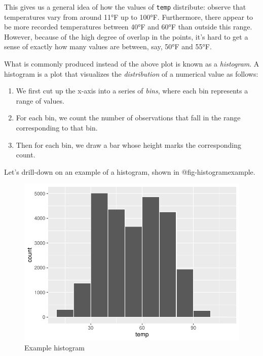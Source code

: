 \documentclass[
  letterpaper,
  DIV=11,
  numbers=noendperiod]{scrreprt}
\theoremstyle{definition}
\theoremstyle{remark}
\begin{document}
This gives us a general idea of how the values of \texttt{temp}
distribute: observe that temperatures vary from around 11°F up to 100°F.
Furthermore, there appear to be more recorded temperatures between 40°F
and 60°F than outside this range. However, because of the high degree of
overlap in the points, it's hard to get a sense of exactly how many
values are between, say, 50°F and 55°F.

What is commonly produced instead of the above plot is known as a
\emph{histogram}. A histogram is a plot that visualizes the
\emph{distribution} of a numerical value as follows:

\begin{enumerate}
\def\labelenumi{\arabic{enumi}.}
\item
  We first cut up the x-axis into a series of \emph{bins}, where each
  bin represents a range of values.
\item
  For each bin, we count the number of observations that fall in the
  range corresponding to that bin.
\item
  Then for each bin, we draw a bar whose height marks the corresponding
  count.
\end{enumerate}

Let's drill-down on an example of a histogram, shown in
@fig-histogramexample.

\begin{figure}

{\centering \includegraphics{02-visualization_files/figure-pdf/fig-histogramexample-1.pdf}

}

\caption{\label{fig-histogramexample}Example histogram}

\end{figure}
\end{document}
